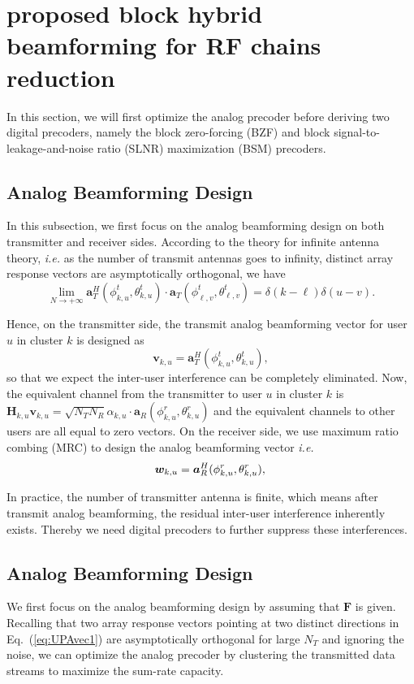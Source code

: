 \documentclass[conference]{IEEEtran}
\begin{document}
{\section{proposed block hybrid beamforming for RF chains reduction}
In this section, we will first optimize the analog precoder before deriving two digital precoders, namely the block zero-forcing (BZF) and block signal-to-leakage-and-noise ratio (SLNR) maximization (BSM) precoders.

\subsection{Analog Beamforming Design}
In this subsection, we first focus on the analog beamforming design on both transmitter and receiver sides. According to the theory for infinite antenna theory, \textit{i.e.} as the number of transmit antennas goes to infinity, distinct array response vectors are asymptotically orthogonal, we have
\begin{equation}\label{Eq:assumption}
\lim_{N\rightarrow +\infty} \bm{a}_{T}^{H}(\phi^t_{k,u},\theta^t_{k,u}) \cdot\bm{a}_{T}(\phi^t_{\ell,v},\theta^t_{\ell,v})=\delta(k-\ell)\delta(u-v).
\end{equation}

Hence, on the transmitter side, the transmit analog beamforming vector for user $u$ in cluster $k$ is designed as
\begin{equation}
\bm{v}_{k,u}=\bm{a}_{T}^{H}(\phi^t_{k,u},\theta^t_{k,u}),
\label{eq:vku}
\end{equation}
so that we expect the inter-user interference can be completely eliminated. Now, the equivalent channel from the transmitter to user $u$ in cluster $k$ is $\bm{H}_{k,u}\bm{v}_{k,u}=\sqrt{N_{T}N_{R}}\alpha_{k,u}\cdot \bm{a}_{R}(\phi^r_{k,u},\theta^r_{k,u})$ and the equivalent channels to other users are all equal to zero vectors. On the receiver side, we use maximum ratio combing (MRC) to design the analog beamforming vector \textit{i.e.}
\begin{equation}
\bm{w}_{k,u}=\bm{a}_{R}^{H}(\phi^r_{k,u},\theta^r_{k,u}),\\
\label{eq:wku}
\end{equation}

In practice, the number of transmitter antenna is finite, which means after transmit analog beamforming, the residual inter-user interference inherently exists. Thereby we need digital precoders to further suppress these interferences.

\subsection{Analog Beamforming Design}
We first focus on the analog beamforming design by assuming that $\bm F$ is given. Recalling that two array response vectors pointing at two distinct directions in Eq.~(\ref{eq:UPAvec1}) are asymptotically orthogonal for large $N_T$ and ignoring the noise, we can optimize the analog precoder by clustering the transmitted data streams to maximize the sum-rate capacity.

}
\end{document}

